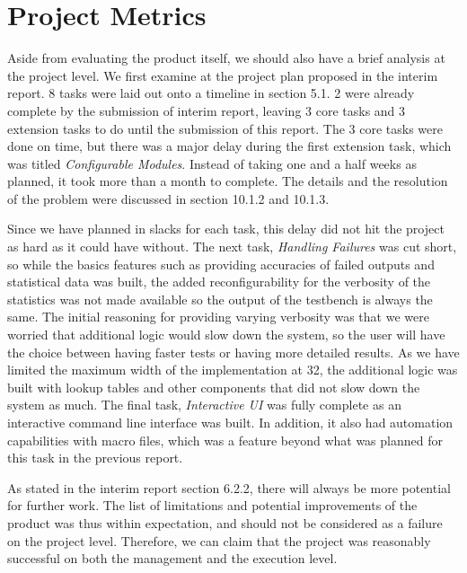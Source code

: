 \section{Project Metrics}
Aside from evaluating the product itself, we should also have a brief analysis at the project level.
We first examine at the project plan proposed in the interim report.
8 tasks were laid out onto a timeline in section 5.1.
2 were already complete by the submission of interim report, leaving 3 core tasks and 3 extension tasks to do until the submission of this report.
The 3 core tasks were done on time, but there was a major delay during the first extension task, which was titled \textit{Configurable Modules}.
Instead of taking one and a half weeks as planned, it took more than a month to complete.
The details and the resolution of the problem were discussed in section 10.1.2 and 10.1.3.

Since we have planned in slacks for each task, this delay did not hit the project as hard as it could have without.
The next task, \textit{Handling Failures} was cut short, so while the basics features such as providing accuracies of failed outputs and statistical data was built, the added reconfigurability for the verbosity of the statistics was not made available so the output of the testbench is always the same.
The initial reasoning for providing varying verbosity was that we were worried that additional logic would slow down the system, so the user will have the choice between having faster tests or having more detailed results.
As we have limited the maximum width of the implementation at 32, the additional logic was built with lookup tables and other components that did not slow down the system as much.
The final task, \textit{Interactive UI} was fully complete as an interactive command line interface was built.
In addition, it also had automation capabilities with macro files, which was a feature beyond what was planned for this task in the previous report.

As stated in the interim report section 6.2.2, there will always be more potential for further work.
The list of limitations and potential improvements of the product was thus within expectation, and should not be considered as a failure on the project level.
Therefore, we can claim that the project was reasonably successful on both the management and the execution level.
